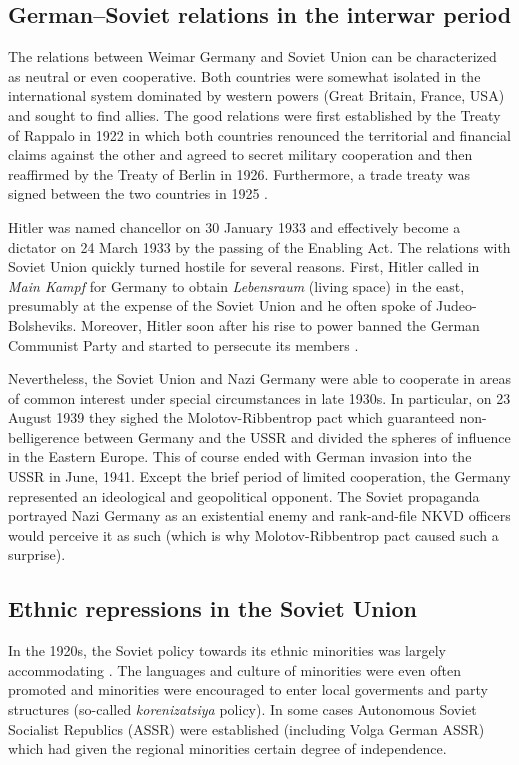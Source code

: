 \subsection{German–Soviet relations in the interwar period}
The relations between Weimar Germany and Soviet Union can be characterized as neutral or even cooperative. Both countries were somewhat isolated in the international system dominated by western powers (Great Britain, France, USA) and sought to find allies. The good relations were first established by the Treaty of Rappalo in 1922 in which both countries renounced the territorial and financial claims against the other and agreed to secret military cooperation \citep{gatzke_russo-german_1958} and then reaffirmed by the Treaty of Berlin in 1926. Furthermore, a trade treaty was signed between the two countries in 1925 \citep{morgan_political_1963}.

Hitler was named chancellor on 30 January 1933 and effectively become a dictator on 24 March 1933 by the passing of the Enabling Act. 
The relations with Soviet Union quickly turned hostile for several reasons.  First, Hitler called in \emph{Main Kampf} for Germany to obtain \emph{Lebensraum} (living space) in the east, presumably at the expense of the Soviet Union and he often spoke of Judeo-Bolsheviks. Moreover, Hitler soon after his rise to power banned the German Communist Party and started to persecute its members  \citep{haslam_soviet_1984}. 

Nevertheless, the Soviet Union and Nazi Germany were able to cooperate in
areas of common interest under special circumstances in late 1930s. In
particular, on 23 August 1939 they sighed the  Molotov-Ribbentrop pact which guaranteed non-belligerence between Germany and the USSR and divided
the spheres of influence in the Eastern Europe. This of course ended with
German invasion into the USSR in June, 1941.  
Except the brief period of limited cooperation, the Germany represented an ideological and geopolitical opponent. The Soviet propaganda portrayed Nazi
Germany as an existential enemy and rank-and-file NKVD officers would
perceive it as such (which is why Molotov-Ribbentrop pact caused such a surprise). \citep{kotkin_stalin:_2017}
\subsection{Ethnic repressions in the Soviet Union}
In the 1920s, the Soviet policy towards its ethnic minorities was largely accommodating \citep{martin_affirmative_2001}. The languages and culture of minorities were even often promoted and minorities were encouraged to enter local goverments and party structures (so-called \emph{korenizatsiya} policy). In some cases Autonomous Soviet Socialist Republics (ASSR) were established (including Volga German ASSR) which had given the regional minorities certain degree of independence.  

